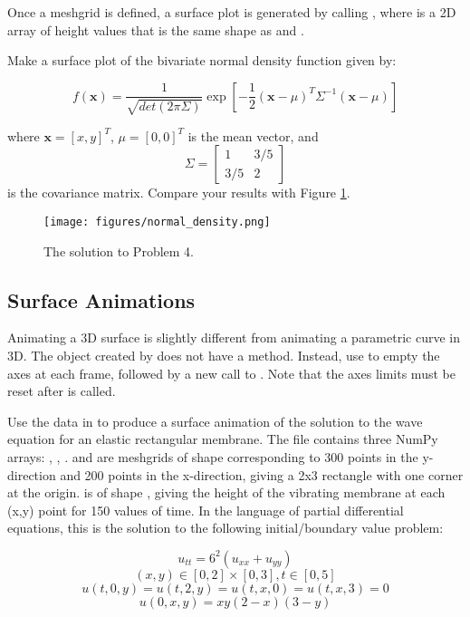 Once a meshgrid is defined, a surface plot is generated by calling , where  is a 2D array of height values that is the same shape as  and . 

\begin{problem}
Make a surface plot of the bivariate normal density function given by:

$$f(\mathbf{x})=\frac{1}{\sqrt{det(2\pi \Sigma)}}\exp{\left[-\frac{1}{2}(\mathbf{x} - \mu)^T \Sigma^{-1} (\mathbf{x} - \mu)\right]}$$

where $\mathbf{x}=[x,y]^T$, $\mu=[0,0]^T$ is the mean vector, and $$\Sigma = \begin{bmatrix} 1 & 3/5 \\ 3/5 & 2 \end{bmatrix}$$ is the covariance matrix. Compare your results with Figure \ref{lab0:surf}.
\end{problem}

\begin{figure}[H]
\centering
\texttt{[image: figures/normal\_density.png]}
\caption{The solution to Problem 4.}
\label{lab0:surf}
\end{figure}

\subsection*{Surface Animations}
Animating a 3D surface is slightly different from animating a parametric curve in 3D.
The object created by  does not have a  method.
Instead, use  to empty the axes at each frame, followed by a new call to .
Note that the axes limits must be reset after  is called. 

\begin{problem}
Use the data in  to produce a surface animation of the solution to the wave equation for an elastic rectangular membrane.
The file contains three NumPy arrays: , , .
 and  are meshgrids of shape  corresponding to 300 points in the y-direction and 200 points in the x-direction, giving a 2x3 rectangle with one corner at the origin.
 is of shape , giving the height of the vibrating membrane at each (x,y) point for 150 values of time. 
In the language of partial differential equations, this is the solution to the following initial/boundary value problem:

$$u_{tt} = 6^2(u_{xx}+u_{yy})$$
$$(x,y) \in [0,2]\times[0,3], t \in [0,5]$$
$$u(t,0,y)=u(t,2,y)=u(t,x,0)=u(t,x,3) = 0$$
$$u(0,x,y) = xy(2-x)(3-y)$$
\end{problem}